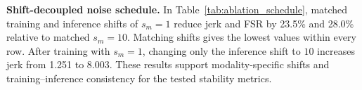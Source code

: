 \noindent\textbf{Shift-decoupled noise schedule.} In Table~\ref{tab:ablation_schedule}, matched training and inference shifts of $s_m=1$ reduce jerk and FSR by 23.5\% and 28.0\% relative to matched $s_m=10$. Matching shifts gives the lowest values within every row. After training with $s_m=1$, changing only the inference shift to $10$ increases jerk from 1.251 to 8.003. These results support modality-specific shifts and training--inference consistency for the tested stability metrics.

